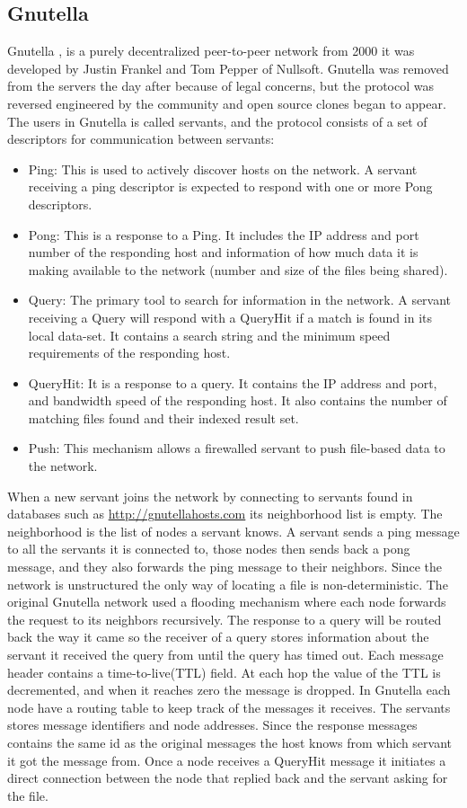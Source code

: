 \subsection{Gnutella}
\label{sec:gnutella}
Gnutella \citep{Androutsellis-Theotokis:2004:SPC:1041680.1041681},\citep{gnutella:specifikation} is a purely decentralized peer-to-peer network from 2000 it was developed by Justin Frankel and Tom Pepper of Nullsoft. Gnutella was removed from the servers the day after because of legal concerns, but the protocol was reversed engineered by the community and open source clones began to appear.
The users in Gnutella is called servants, and the protocol consists of a set of descriptors for communication between servants:
\begin{itemize}
\item Ping: This is used to actively discover hosts on the network. A servant receiving a ping descriptor is expected to respond with one or more Pong descriptors.
\item Pong: This is a response to a Ping. It includes the IP address and port number of the responding host and information of how much data it is making available to the network (number and size of the files being shared).
\item Query: The primary tool to search for information in the network. A servant receiving a Query will respond with a QueryHit if a match is found in its local data-set. It contains a search string and the minimum speed requirements of the responding host.
\item QueryHit: It is a response to a query. It contains the IP address and port, and bandwidth speed of the responding host. It also contains the number of matching files found and their indexed result set.
\item Push: This mechanism allows a firewalled servant to push file-based data to the network.
\end{itemize}
When a new servant joins the network by connecting to servants found in databases such as \url{http://gnutellahosts.com} its neighborhood list is empty. The neighborhood is the list of nodes a servant knows. A servant sends a ping message to all the servants it is connected to, those nodes then sends back a pong message, and they also forwards the ping message to their neighbors.
Since the network is unstructured the only way of locating a file is non-deterministic. The original Gnutella network used a flooding mechanism where each node forwards the request to its neighbors recursively. The response to a query will be routed back the way it came so the receiver of a query stores information about the servant it received the query from until the query has timed out. Each message header contains a time-to-live(TTL) field. At each hop the value of the TTL is decremented, and when it reaches zero the message is dropped. In Gnutella each node have a routing table to keep track of the messages it receives. The servants stores message identifiers and node addresses. Since the response messages contains the same id as the original messages the host knows from which servant it got the message from.
Once a node receives a QueryHit message it initiates a direct connection between the node that replied back and the servant asking for the file.

